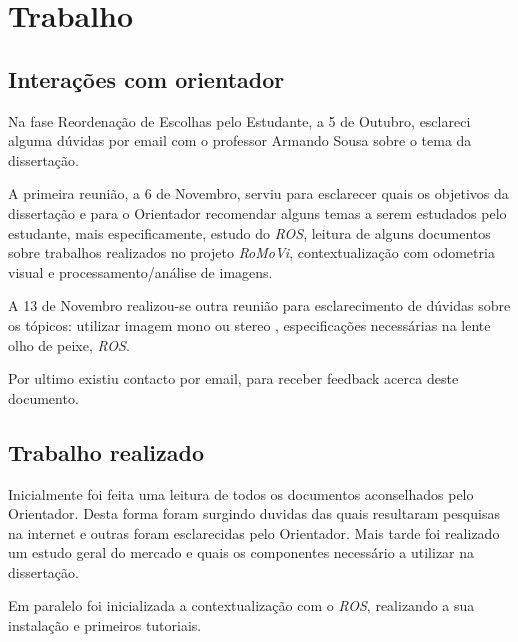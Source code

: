 \chapter{Trabalho} \label{chap:sota}
\section{Interações com orientador}\label{chap:descricao}
Na fase Reordenação de Escolhas pelo Estudante, a 5 de Outubro, esclareci alguma dúvidas por email com o professor Armando Sousa sobre o tema da dissertação.
		
A primeira reunião, a 6 de Novembro, serviu para esclarecer quais os objetivos da dissertação e para o Orientador recomendar alguns temas a serem estudados pelo estudante, mais especificamente, estudo do \textit{ROS}, leitura de alguns documentos sobre trabalhos realizados no projeto \textit{RoMoVi}, contextualização com odometria visual e processamento/análise de imagens.

A 13 de Novembro realizou-se outra reunião para esclarecimento de dúvidas sobre os tópicos: utilizar imagem mono ou stereo , especificações necessárias na lente olho de peixe, \textit{ROS}.

Por ultimo existiu contacto por email, para receber feedback acerca deste documento.
	

\section{Trabalho realizado}\label{sec:proximas etapas}

Inicialmente foi feita uma leitura de todos os documentos aconselhados pelo Orientador. Desta forma foram surgindo duvidas das quais resultaram pesquisas na internet e outras foram esclarecidas pelo Orientador. Mais tarde foi realizado um estudo geral do mercado e quais os componentes necessário a utilizar na dissertação.

Em paralelo foi inicializada a contextualização com o \textit{ROS}, realizando a sua instalação e primeiros tutoriais.
